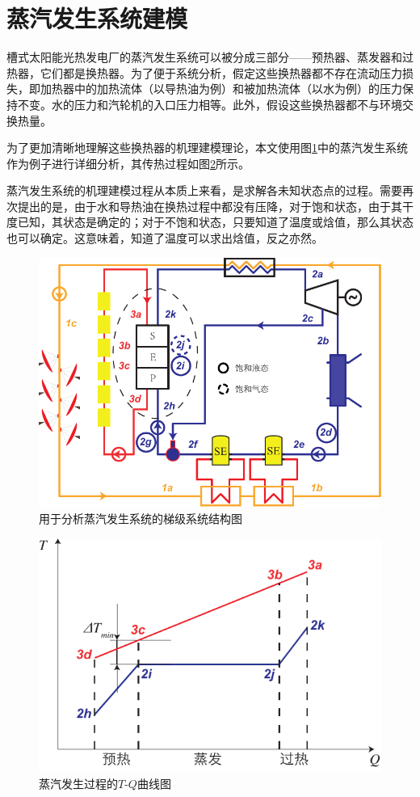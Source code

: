 \section{蒸汽发生系统建模}
槽式太阳能光热发电厂的蒸汽发生系统可以被分成三部分——预热器、蒸发器和过热器，它们都是换热器。为了便于系统分析，假定这些换热器都不存在流动压力损失，即加热器中的加热流体（以导热油为例）和被加热流体（以水为例）的压力保持不变。水的压力和汽轮机的入口压力相等。此外，假设这些换热器都不与环境交换热量。

为了更加清晰地理解这些换热器的机理建模理论，本文使用图\ref{fig:PES}中的蒸汽发生系统作为例子进行详细分析，其传热过程如图\ref{fig:PES_TQ}所示。

蒸汽发生系统的机理建模过程从本质上来看，是求解各未知状态点的过程。需要再次提出的是，由于水和导热油在换热过程中都没有压降，对于饱和状态，由于其干度已知，其状态是确定的；对于不饱和状态，只要知道了温度或焓值，那么其状态也可以确定。这意味着，知道了温度可以求出焓值，反之亦然。

\noindent \begin{figure}[ht!]
	\centering
	\includegraphics[width = 0.8\columnwidth]{fig/PES}
	\caption{用于分析蒸汽发生系统的梯级系统结构图}
	\label{fig:PES}
\end{figure}

\begin{figure}[ht!]
	\centering
	\includegraphics[width = 0.6\columnwidth]{fig/PES_TQ}
	\caption{蒸汽发生过程的$T$-$Q$曲线图}
	\label{fig:PES_TQ}
\end{figure}

